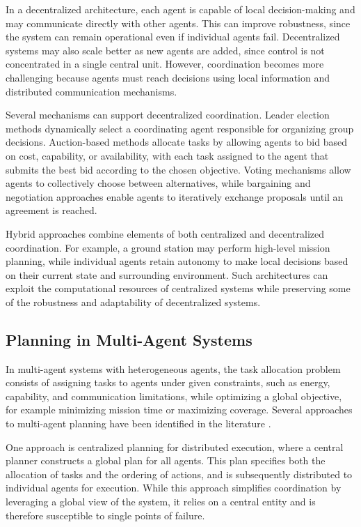 In a decentralized architecture, each agent is capable of local decision-making and may communicate directly with other agents. 
This can improve robustness, since the system can remain operational even if individual agents fail. 
Decentralized systems may also scale better as new agents are added, since control is not concentrated in a single central unit. 
However, coordination becomes more challenging because agents must reach decisions using local information and distributed communication mechanisms.

Several mechanisms can support decentralized coordination. 
Leader election methods dynamically select a coordinating agent responsible for organizing group decisions. 
Auction-based methods allocate tasks by allowing agents to bid based on cost, capability, or availability, with each task assigned to the agent that submits the best bid according to the chosen objective.
Voting mechanisms allow agents to collectively choose between alternatives, 
while bargaining and negotiation approaches enable agents to iteratively exchange proposals until an agreement is reached.

Hybrid approaches combine elements of both centralized and decentralized coordination. 
For example, a ground station may perform high-level mission planning, 
while individual agents retain autonomy to make local decisions based on their current state and surrounding environment. 
Such architectures can exploit the computational resources of centralized systems while preserving some of the robustness and adaptability of decentralized systems.

\subsection{Planning in Multi-Agent Systems}

In multi-agent systems with heterogeneous agents, the task allocation problem consists of assigning tasks to agents under given constraints, such as energy, capability,
and communication limitations, while optimizing a global objective, for example minimizing mission time or maximizing coverage.
Several approaches to multi-agent planning have been identified in the literature \cite{durfee1999dpsp}.

One approach is centralized planning for distributed execution, where a central planner constructs a global plan for all agents. 
This plan specifies both the allocation of tasks and the ordering of actions, and is subsequently distributed to individual agents for execution. 
While this approach simplifies coordination by leveraging a global view of the system, it relies on a central entity and is therefore susceptible to single points of failure.

